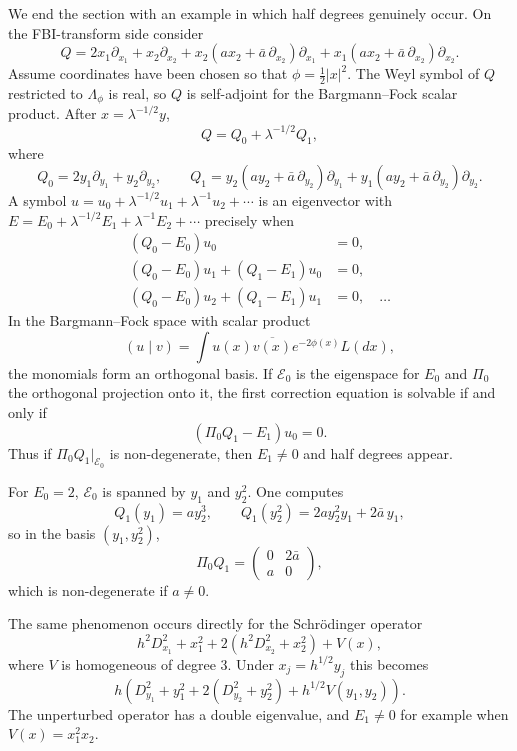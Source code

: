 \documentclass[11pt,a4paper]{article}
\numberwithin{equation}{section}
\theoremstyle{remark}
\begin{document}
We end the section with an example in which half degrees genuinely occur. On the FBI-transform side consider
\begin{equation}
Q=2x_1\partial_{x_1}+x_2\partial_{x_2}
+x_2(a x_2+\bar a\,\partial_{x_2})\partial_{x_1}
+x_1(a x_2+\bar a\,\partial_{x_2})\partial_{x_2}.
\tag{3.28}
\end{equation}
Assume coordinates have been chosen so that $\phi=\frac12|x|^2$. The Weyl symbol of $Q$ restricted to $\Lambda_\phi$ is real, so $Q$ is self-adjoint for the Bargmann--Fock scalar product. After $x=\lambda^{-1/2}y$,
\[
Q=Q_0+\lambda^{-1/2}Q_1,
\]
where
\[
Q_0=2y_1\partial_{y_1}+y_2\partial_{y_2},
\qquad
Q_1=y_2(a y_2+\bar a\,\partial_{y_2})\partial_{y_1}
+y_1(a y_2+\bar a\,\partial_{y_2})\partial_{y_2}.
\]
A symbol $u=u_0+\lambda^{-1/2}u_1+\lambda^{-1}u_2+\cdots$ is an eigenvector with $E=E_0+\lambda^{-1/2}E_1+\lambda^{-1}E_2+\cdots$ precisely when
\begin{align*}
(Q_0-E_0)u_0&=0,\\
(Q_0-E_0)u_1+(Q_1-E_1)u_0&=0,\\
(Q_0-E_0)u_2+(Q_1-E_1)u_1&=0,\quad\ldots
\end{align*}
In the Bargmann--Fock space with scalar product
\begin{equation}
(u\mid v)=\int u(x)\overline{v(x)}e^{-2\phi(x)}L(dx),
\end{equation}
the monomials form an orthogonal basis. If $\mathcal E_0$ is the eigenspace for $E_0$ and $\Pi_0$ the orthogonal projection onto it, the first correction equation is solvable if and only if
\[
(\Pi_0Q_1-E_1)u_0=0.
\]
Thus if $\Pi_0Q_1|_{\mathcal E_0}$ is non-degenerate, then $E_1\ne0$ and half degrees appear.

For $E_0=2$, $\mathcal E_0$ is spanned by $y_1$ and $y_2^2$. One computes
\[
Q_1(y_1)=a y_2^3,
\qquad
Q_1(y_2^2)=2a y_2^2y_1+2\bar a\,y_1,
\]
so in the basis $(y_1,y_2^2)$,
\[
\Pi_0Q_1=\begin{pmatrix}0&2\bar a\\ a&0\end{pmatrix},
\]
which is non-degenerate if $a\ne0$.

The same phenomenon occurs directly for the Schr\"odinger operator
\[
h^2D_{x_1}^2+x_1^2+2(h^2D_{x_2}^2+x_2^2)+V(x),
\]
where $V$ is homogeneous of degree $3$. Under $x_j=h^{1/2}y_j$ this becomes
\[
h\left(D_{y_1}^2+y_1^2+2(D_{y_2}^2+y_2^2)+h^{1/2}V(y_1,y_2)\right).
\]
The unperturbed operator has a double eigenvalue, and $E_1\ne0$ for example when $V(x)=x_1^2x_2$.
\end{document}
